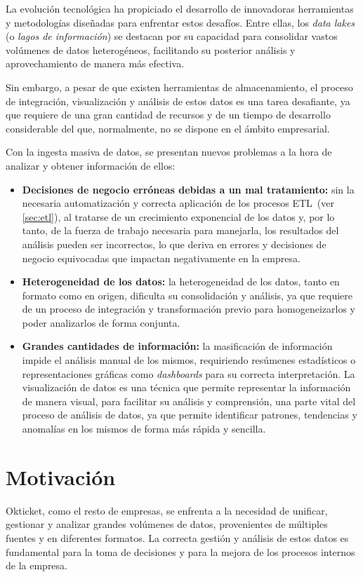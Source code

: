 La evolución tecnológica ha propiciado el desarrollo de innovadoras herramientas
y metodologías diseñadas para enfrentar estos desafíos. Entre ellas, los
\textit{data lakes} (o \emph{lagos de información}) se destacan por su capacidad
para consolidar vastos volúmenes de datos heterogéneos, facilitando su posterior
análisis y aprovechamiento de manera más efectiva.

Sin embargo, a pesar de que existen herramientas de almacenamiento, el proceso
de integración, visualización y análisis de estos datos es una tarea desafiante,
ya que requiere de una gran cantidad de recursos y de un tiempo de desarrollo
considerable del que, normalmente, no se dispone en el ámbito empresarial.

Con la ingesta masiva de datos, se presentan nuevos problemas a la hora de
analizar y obtener información de ellos:

\begin{itemize}
	\item \textbf{Decisiones de negocio erróneas debidas a un mal tratamiento:}
		sin la necesaria automatización y correcta aplicación de los procesos
		ETL~(ver \ref{sec:etl}), al tratarse de un crecimiento exponencial de los datos y, por lo
		tanto, de la fuerza de trabajo necesaria para manejarla, los resultados
		del análisis pueden ser incorrectos, lo que deriva en errores y
		decisiones de negocio equivocadas que impactan negativamente en la
		empresa.
	\item \textbf{Heterogeneidad de los datos:}
		la heterogeneidad de los datos, tanto en formato como en origen,
		dificulta su consolidación y análisis, ya que requiere de un proceso de
		integración y transformación previo para homogeneizarlos y poder
		analizarlos de forma conjunta.
	\item \textbf{Grandes cantidades de información:}
		la masificación de información impide el análisis manual de los
		mismos, requiriendo resúmenes estadísticos o representaciones gráficas
		como \textit{dashboards} para su correcta interpretación.
		La visualización de datos es una técnica que permite representar la
		información de manera visual, para facilitar su análisis y comprensión,
		una parte vital del proceso de análisis de datos, ya que permite
		identificar patrones, tendencias y anomalías en los mismos de forma más
		rápida y sencilla.
\end{itemize}

\newpage{}
\section{Motivación}\label{sec:motivacion}
Okticket, como el resto de empresas, se enfrenta a la necesidad de unificar, gestionar y
analizar grandes volúmenes de datos, provenientes de múltiples fuentes y en
diferentes formatos. La correcta gestión y análisis de estos datos es
fundamental para la toma de decisiones y para la mejora de los procesos internos
de la empresa.

